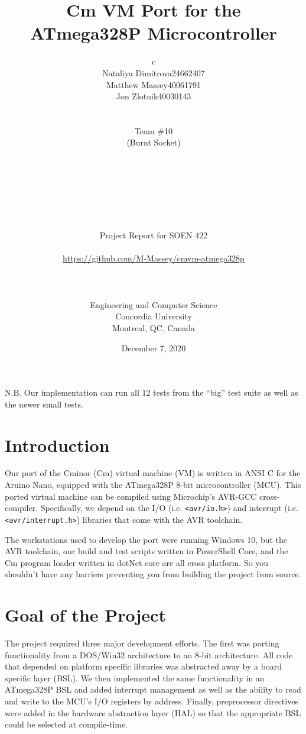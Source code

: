 \documentclass[12pt]{article}
\title{Cm VM Port for the\\ATmega328P Microcontroller}
\author{
\begin{tabular}{c}

\begin{tabular}{r l}
    Nataliya Dimitrova & 24662407 \\
    Matthew Massey & 40061791 \\
    Jon Zlotnik & 40030143
\end{tabular}\\ \\
Team \#10 \\ 
(Burnt Socket)\\ \\ \\
\\ \\ \\ \\ \\
Project Report for SOEN 422\\ \\
\url{https://github.com/M-Massey/cmvm-atmega328p}\\
\\ \\ \\
Engineering and Computer Science\\
Concordia University\\
Montreal, QC, Canada
\end{tabular}
}
\date{December 7, 2020}
\begin{document}
\maketitle
\thispagestyle{empty}

\clearpage
{} 

N.B. Our implementation can run all 12 tests from the ``big'' test suite as well as the newer small tests.

\section{Introduction}


Our port of the Cminor (Cm) virtual machine (VM) is written in ANSI C for the Aruino Nano, equipped with the ATmega328P 8-bit microcontroller (MCU).
This ported virtual machine can be compiled using Microchip's AVR-GCC cross-compiler.
Specifically, we depend on the I/O (i.e. \lstinline[columns=fixed]{<avr/io.h>}) and interrupt (i.e. \lstinline[columns=fixed]{<avr/interrupt.h>}) libraries that come with the AVR toolchain.

The workstations used to develop the port were running Windows 10, but the AVR toolchain, our build and test scripts written in PowerShell Core, and the Cm program loader written in dotNet core are all cross platform.
So you shouldn't have any barriers preventing you from building the project from source.


\section{Goal of the Project}


The project required three major development efforts. The first was porting functionality from a DOS/Win32 architecture to an 8-bit architecture. 
All code that depended on platform specific libraries was abstracted away by a board specific layer (BSL). 
We then implemented the same functionality in an ATmega328P BSL and added interrupt management as well as the ability to read and write to the MCU's I/O registers by address.
Finally, preprocessor directives were added in the hardware abstraction layer (HAL) so that the appropriate BSL could be selected at compile-time.
\end{document}
